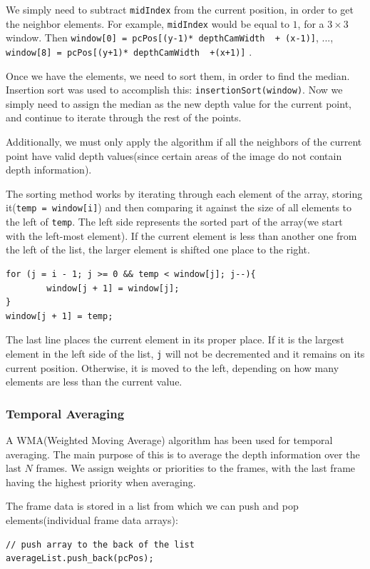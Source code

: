 \documentclass[]{article}
\begin{document}
We simply need to subtract \verb|midIndex| from the current position, in order to get the neighbor elements. For example, \verb|midIndex| would be equal to $1$, for a $3 \times 3$ window. Then \verb|window[0] = pcPos[(y-1)* depthCamWidth  + (x-1)]|, ..., \verb|window[8] = pcPos[(y+1)* depthCamWidth  +(x+1)]| .

Once we have the elements, we need to sort them, in order to find the median. Insertion sort was used to accomplish this: \verb|insertionSort(window)|. Now we simply need to assign the median as the new depth value for the current point, and continue to iterate through the rest of the points.

Additionally, we must only apply the algorithm if all the neighbors of the current point have valid depth values(since certain areas of the image do not contain depth information).

The sorting method works by iterating through each element of the array, storing it(\verb|temp = window[i]|) and then comparing it against the size of all elements to the left of \verb|temp|. The left side represents the sorted part of the array(we start with the left-most element). If the current element is less than another one from the left of the list, the larger element is shifted one place to the right.
\begin{verbatim}
for (j = i - 1; j >= 0 && temp < window[j]; j--){
		window[j + 1] = window[j];
}
window[j + 1] = temp;
\end{verbatim}

The last line places the current element in its proper place. If it is the largest element in the left side of the list, \verb|j| will not be decremented and it remains on its current position. Otherwise, it is moved to the left, depending on how many elements are less than the current value. 		


\subsubsection{Temporal Averaging}

A WMA(Weighted Moving Average) algorithm has been used for temporal averaging. The main purpose of this is to average the depth information over the last $N$ frames. We assign weights or priorities to the frames, with the last frame having the highest priority when averaging.

The frame data is stored in a list from which we can push and pop elements(individual frame data arrays):
\begin{verbatim}
// push array to the back of the list
averageList.push_back(pcPos);
\end{verbatim}
\end{document}
